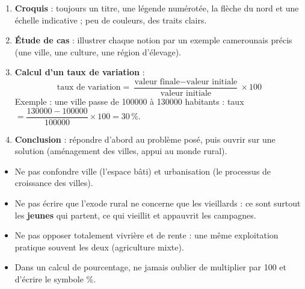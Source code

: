 \documentclass[11pt]{article}
\newcommand{\cle}[1]{{\popxbold\color{popdark}#1}}
\begin{document}
\begin{methode}
\begin{enumerate}
  \item \textbf{Croquis} : toujours un titre, une légende numérotée, la flèche du nord et une échelle indicative ; peu de couleurs, des traits clairs.
  \item \textbf{Étude de cas} : illustrer chaque notion par un exemple camerounais précis (une ville, une culture, une région d'élevage).
  \item \textbf{Calcul d'un taux de variation} :
  \[ \text{taux de variation} = \frac{\text{valeur finale} - \text{valeur initiale}}{\text{valeur initiale}} \times 100 \]
  Exemple : une ville passe de \num{100000} à \num{130000} habitants : taux $= \dfrac{130000 - 100000}{100000} \times 100 = 30\,\%$.
  \item \textbf{Conclusion} : répondre d'abord au problème posé, puis ouvrir sur une solution (aménagement des villes, appui au monde rural).
\end{enumerate}
\end{methode}

\begin{attention}
\begin{itemize}
  \item Ne pas confondre \cle{ville} (l'espace bâti) et \cle{urbanisation} (le processus de croissance des villes).
  \item Ne pas écrire que l'exode rural ne concerne que les vieillards : ce sont surtout les \textbf{jeunes} qui partent, ce qui vieillit et appauvrit les campagnes.
  \item Ne pas opposer totalement vivrière et de rente : une même exploitation pratique souvent les deux (agriculture mixte).
  \item Dans un calcul de pourcentage, ne jamais oublier de multiplier par 100 et d'écrire le symbole \%.
\end{itemize}
\end{attention}
\end{document}
